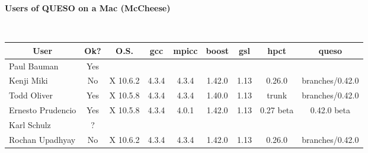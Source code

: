 \documentclass[12pt,letterpaper,twoside,onecolumn,portrait,leqno]{book}
\begin{document}
\setlength{\unitlength}{1.0in}
\setlength{\parindent}{0cm}
\setlength{\parskip}{2ex}
\thispagestyle{empty}

\centerline{\bf Users of QUESO on a Mac (McCheese)}

$~$\\

\begin{table}[!h]
\begin{center}
\begin{tabular}{|l|c|c|c|c|c|c|c|c|}
\hline
\multicolumn{1}{|c|}{User} & Ok? & O.S.     & gcc    & mpicc   & boost  & gsl   & hpct      & queso       \\
\hline
\hline
Paul Bauman                & Yes &          &        &         &        &       &           &             \\
\hline
Kenji Miki                 & No  & X 10.6.2 & 4.3.4  & 4.3.4   & 1.42.0 &1.13  & 0.26.0    & branches/0.42.0  \\
\hline
Todd Oliver                & Yes & X 10.5.8 & 4.3.4  & 4.3.4   & 1.40.0 & 1.13  & trunk     & branches/0.42.0   \\
\hline
Ernesto Prudencio          & Yes & X 10.5.8 & 4.3.4  & 4.0.1   & 1.42.0 & 1.13  & 0.27 beta & 0.42.0 beta \\
\hline
Karl Schulz                & ?   &          &        &         &        &       &           &             \\
\hline
Rochan Upadhyay            & No  & X 10.6.2 & 4.3.4  & 4.3.4   & 1.42.0 & 1.13  & 0.26.0    & branches/0.42.0 \\
\hline
\end{tabular}
\end{center}
\end{table}
\end{document}
